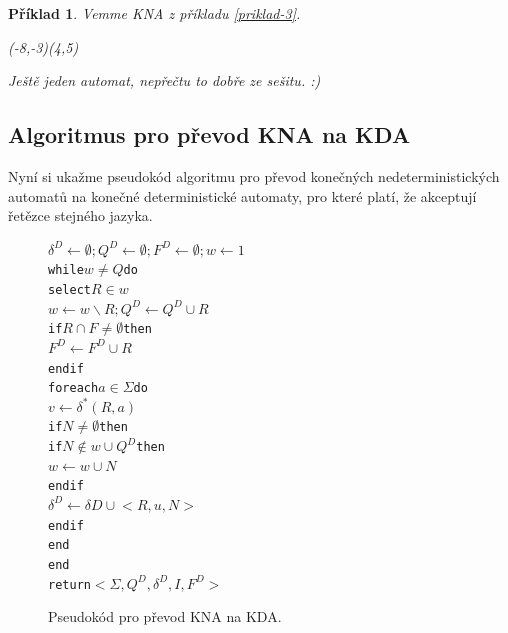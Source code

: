 \documentclass[10pt, a4paper, titlepage]{article}
\theoremstyle{note}
\newtheorem{priklad}{\textbf{Příklad}}
\begin{document}
\begin{priklad}
Vemme KNA z příkladu \ref{priklad-3}.

\begin{VCPicture}{(-8,-3)(4,5)}


\end{VCPicture}

Ještě jeden automat, nepřečtu to dobře ze sešitu. :)

\end{priklad}

\subsection{Algoritmus pro převod KNA na KDA}
Nyní si ukažme pseudokód algoritmu pro převod konečných nedeterministických automatů na konečné deterministické automaty, pro které platí, že
akceptují řetězce stejného jazyka.

\vspace{30px}
\begin{figure}[h]
\begin{alltt}
\( \delta^{D} \leftarrow \emptyset; Q^{D} \leftarrow \emptyset; F^{D} \leftarrow \emptyset; w \leftarrow {1} \)
while \( w \neq Q \) do
     select \( R \in w \)
     \( w \leftarrow w \smallsetminus {R}; Q^{D} \leftarrow Q^{D} \cup {R} \)
     if \( R \cap F \neq \emptyset \) then
         \( F^{D} \leftarrow F^{D} \cup {R} \)
     endif
     foreach \( a \in \Sigma \) do
         \( v \leftarrow \delta^{*}(R, a) \)
         if \( N \neq \emptyset \) then
             if \( N \notin w \cup Q^{D} \) then
                 \( w \leftarrow w \cup {N} \)
             endif
             \( \delta^{D} \leftarrow \delta{D} \cup {<R, u, N>} \)
         endif
     end
end
return \( <\Sigma, Q^{D}, \delta^{D}, I, F^{D}> \)
\end{alltt}
\caption{Pseudokód pro převod KNA na KDA.}
\end{figure}
\end{document}
